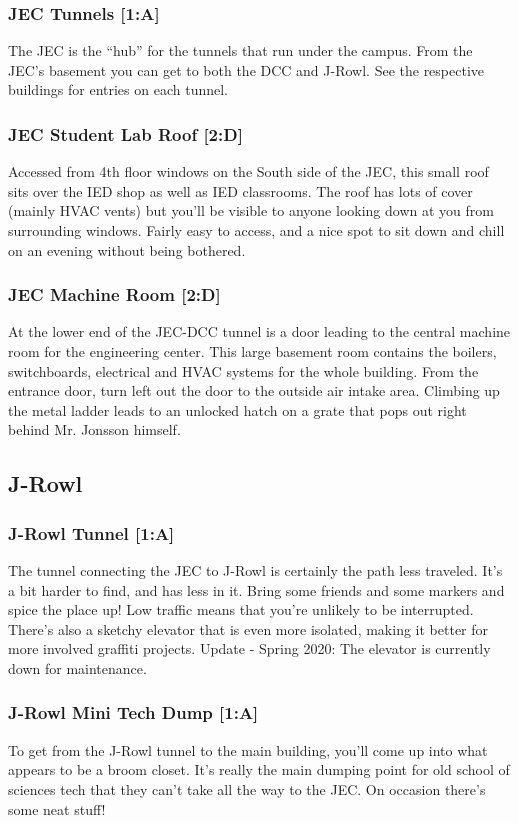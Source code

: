 \documentclass{article}
\begin{document}
\subsubsection{JEC Tunnels [1:A]}
The JEC is the “hub” for the tunnels that run under the campus. From the JEC’s basement you can get to both the DCC and J-Rowl. See the respective buildings for entries on each tunnel.

 \subsubsection{JEC Student Lab Roof [2:D]}
Accessed from 4th floor windows on the South side of the JEC, this small roof sits over the IED shop as well as IED classrooms. The roof has lots of cover (mainly HVAC vents) but you’ll be visible to anyone looking down at you from surrounding windows. Fairly easy to access, and a nice spot to sit down and chill on an evening without being bothered.
\subsubsection{JEC Machine Room [2:D]}
At the lower end of the JEC-DCC tunnel is a door leading to the central machine room for the engineering center. This large basement room contains the boilers, switchboards, electrical and HVAC systems for the whole building. From the entrance door, turn left out the door to the outside air intake area. Climbing up the metal ladder leads to an unlocked hatch on a grate that pops out right behind Mr. Jonsson himself.
\pagebreak
\subsection{J-Rowl}
\subsubsection{J-Rowl Tunnel [1:A]}
The tunnel connecting the JEC to J-Rowl is certainly the path less traveled. It’s a bit harder to find, and has less in it. Bring some friends and some markers and spice the place up! Low traffic means that you’re unlikely to be interrupted. There’s also a sketchy elevator that is even more isolated, making it better for more involved graffiti projects.
Update - Spring 2020: The elevator is currently down for maintenance.
\subsubsection{J-Rowl Mini Tech Dump [1:A]}
To get from the J-Rowl tunnel to the main building, you’ll come up into what appears to be a broom closet. It’s really the main dumping point for old school of sciences tech that they can’t take all the way to the JEC. On occasion there’s some neat stuff!
\end{document}
